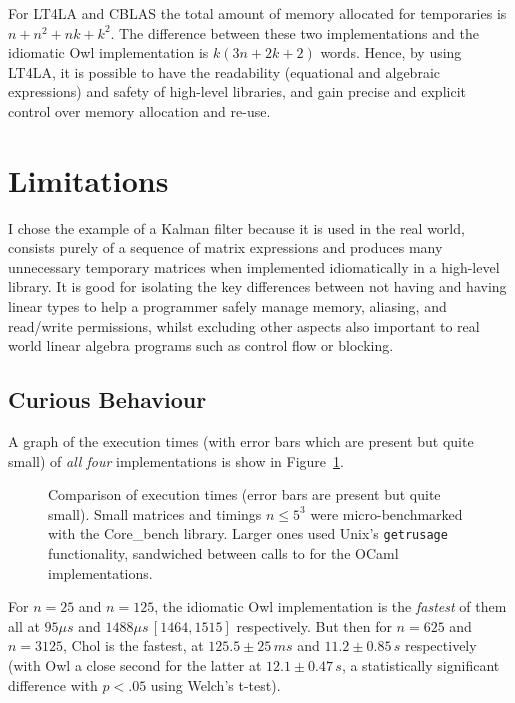 For LT4LA and CBLAS the total amount of memory allocated for temporaries is $n
+ n^2 + nk + k^2$. The difference between these two implementations and the
idiomatic Owl implementation is $k(3n+2k+2)$ words. Hence, by using LT4LA, it
is possible to have the readability (equational and algebraic expressions) and
safety of high-level libraries, and gain precise and explicit control over
memory allocation and re-use.

\section{Limitations}

I chose the example of a Kalman filter because it is used in the real world,
consists purely of a sequence of matrix expressions and produces many
unnecessary temporary matrices when implemented idiomatically in a high-level
library. It is good for isolating the key differences between not having and
having linear types to help a programmer safely manage memory, aliasing, and
read/write permissions, whilst excluding other aspects also important to real
world linear algebra programs such as control flow or blocking.

\subsection{Curious Behaviour}

A graph of the execution times (with error bars which are present but quite
small) of \emph{all four} implementations is show in Figure~\ref{fig:timings_all}.

\begin{figure}[tp]
    \centering
    
    \caption{Comparison of execution times (error bars are present but quite
        small). Small matrices and timings $n \le 5^3$ were micro-benchmarked
        with the Core\_bench library. Larger ones used Unix's
        \texttt{getrusage} functionality, sandwiched between calls to
         for the OCaml implementations.}\label{fig:timings_all}
\end{figure}

For $n=25$ and $n=125$, the idiomatic Owl implementation is the \emph{fastest}
of them all at $95 \mu s$ and $1488 \mu s\, [1464, 1515]$ respectively. But
then for $n=625$ and $n=3125$, Chol is the fastest, at $125.5 \pm 25\, ms$ and
$11.2 \pm 0.85\, s$ respectively (with Owl a close second for the latter at
$12.1 \pm 0.47 \, s$, a statistically significant difference with $p<.05$
using Welch's t-test).

